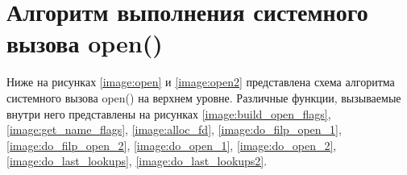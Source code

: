 \section{Алгоритм выполнения системного вызова open()}
Ниже на рисунках \ref{image:open} и \ref{image:open2} представлена схема алгоритма системного вызова open() на верхнем уровне. Различные функции, вызываемые внутри него представлены на рисунках \ref{image:build_open_flags}, \ref{image:get_name_flags}, \ref{image:alloc_fd}, \ref{image:do_filp_open_1}, \ref{image:do_filp_open_2}, \ref{image:do_open_1}, \ref{image:do_open_2}, \ref{image:do_last_lookups}, \ref{image:do_last_lookups2}.
\newpage
\begin{figure}[H]
	\captionsetup{justification=centering}
\end{figure}

